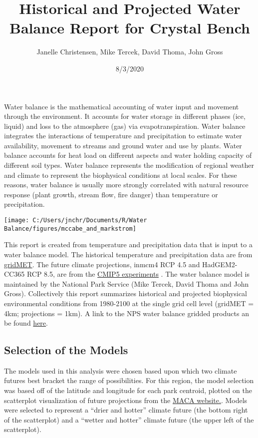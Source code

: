 \documentclass[
]{article}
\title{Historical and Projected Water Balance Report for Crystal Bench}
\author{Janelle Christensen, Mike Tercek, David Thoma, John Gross}
\date{8/3/2020}
\begin{document}
\maketitle

Water balance is the mathematical accounting of water input and movement
through the environment. It accounts for water storage in different
phases (ice, liquid) and loss to the atmosphere (gas) via
evapotranspiration. Water balance integrates the interactions of
temperature and precipitation to estimate water availability, movement
to streams and ground water and use by plants. Water balance accounts
for heat load on different aspects and water holding capacity of
different soil types. Water balance represents the modification of
regional weather and climate to represent the biophysical conditions at
local scales. For these reasons, water balance is usually more strongly
correlated with natural resource response (plant growth, stream flow,
fire danger) than temperature or precipitation.

\begin{center}\texttt{[image: C:/Users/jnchr/Documents/R/Water Balance/figures/mccabe\_and\_markstrom]} \end{center}

This report is created from temperature and precipitation data that is
input to a water balance model. The historical temperature and
precipitation data are from
\href{http://www.climatologylab.org/gridmet.html}{gridMET}. The future
climate projections, inmcm4 RCP 4.5 and HadGEM2-CC365 RCP 8.5, are from
the \href{https://www.wcrp-climate.org/wgcm-cmip/wgcm-cmip5}{CMIP5
experiments} . The water balance model is maintained by the National
Park Service (Mike Tercek, David Thoma and John Gross). Collectively
this report summarizes historical and projected biophysical
environmental conditions from 1980-2100 at the single grid cell level
(gridMET = 4km; projections = 1km). A link to the NPS water balance
gridded products an be found
\href{http://www.yellowstone.solutions/thredds/catalog.html}{here}.

\hypertarget{selection-of-the-models}{%
\subsection{Selection of the Models}\label{selection-of-the-models}}

The models used in this analysis were chosen based upon which two
climate futures best bracket the range of possibilities. For this
region, the model selection was based off of the latitude and longitude
for each park centroid, plotted on the scatterplot visualization of
future projections from the
\href{https://climate.northwestknowledge.net/MACA/vis_scatterplot.php}{MACA
website.}. Models were selected to represent a ``drier and hotter''
climate future (the bottom right of the scatterplot) and a ``wetter and
hotter'' climate future (the upper left of the scatterplot).
\end{document}
